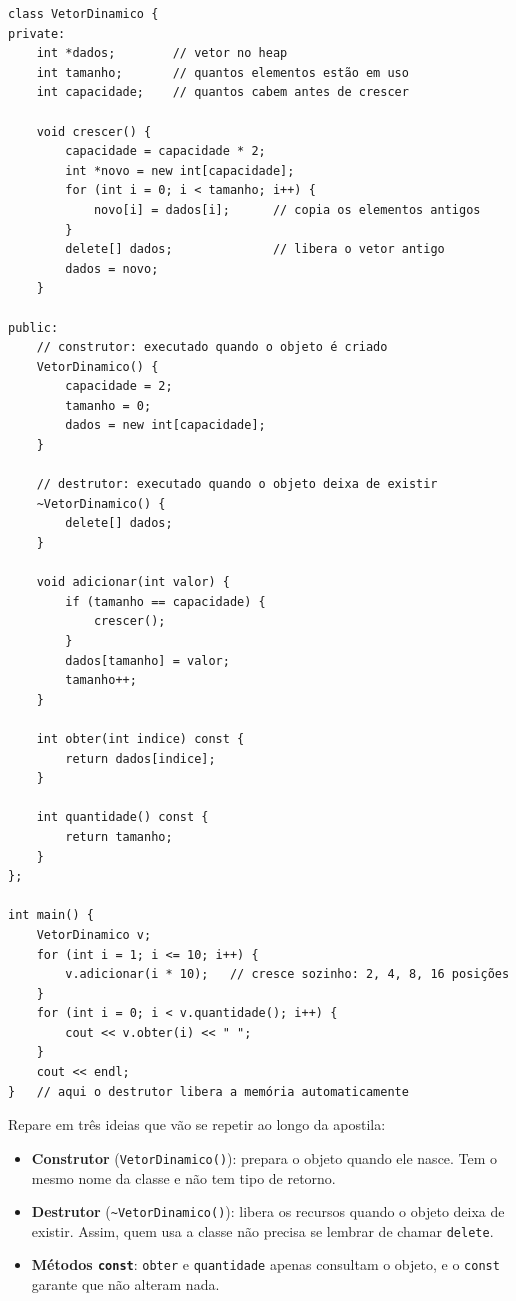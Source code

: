 \begin{codigo}
\begin{Verbatim}[breaklines=true, breaksymbolleft={}, fontsize=\footnotesize]
class VetorDinamico {
private:
    int *dados;        // vetor no heap
    int tamanho;       // quantos elementos estão em uso
    int capacidade;    // quantos cabem antes de crescer

    void crescer() {
        capacidade = capacidade * 2;
        int *novo = new int[capacidade];
        for (int i = 0; i < tamanho; i++) {
            novo[i] = dados[i];      // copia os elementos antigos
        }
        delete[] dados;              // libera o vetor antigo
        dados = novo;
    }

public:
    // construtor: executado quando o objeto é criado
    VetorDinamico() {
        capacidade = 2;
        tamanho = 0;
        dados = new int[capacidade];
    }

    // destrutor: executado quando o objeto deixa de existir
    ~VetorDinamico() {
        delete[] dados;
    }

    void adicionar(int valor) {
        if (tamanho == capacidade) {
            crescer();
        }
        dados[tamanho] = valor;
        tamanho++;
    }

    int obter(int indice) const {
        return dados[indice];
    }

    int quantidade() const {
        return tamanho;
    }
};

int main() {
    VetorDinamico v;
    for (int i = 1; i <= 10; i++) {
        v.adicionar(i * 10);   // cresce sozinho: 2, 4, 8, 16 posições
    }
    for (int i = 0; i < v.quantidade(); i++) {
        cout << v.obter(i) << " ";
    }
    cout << endl;
}   // aqui o destrutor libera a memória automaticamente
\end{Verbatim}
\end{codigo}

Repare em três ideias que vão se repetir ao longo da apostila:

\begin{itemize}
  \item \textbf{Construtor} (\texttt{VetorDinamico()}): prepara o objeto quando ele nasce. Tem o mesmo nome da classe e não tem tipo de retorno.
  \item \textbf{Destrutor} (\texttt{\textasciitilde VetorDinamico()}): libera os recursos quando o objeto deixa de existir. Assim, quem usa a classe não precisa se lembrar de chamar \texttt{delete}.
  \item \textbf{Métodos \texttt{const}}: \texttt{obter} e \texttt{quantidade} apenas consultam o objeto, e o \texttt{const} garante que não alteram nada.
\end{itemize}

